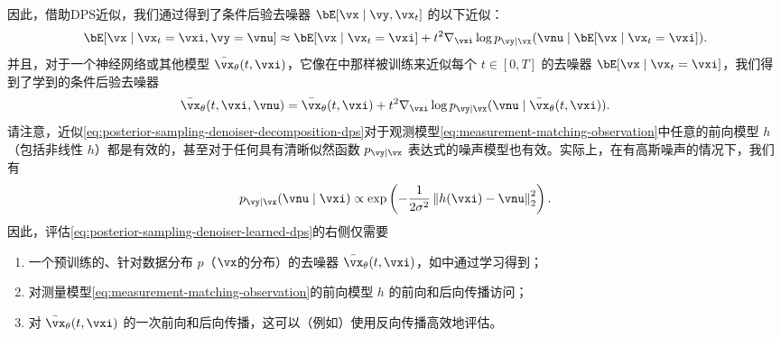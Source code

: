 \documentclass[../../book-main.tex]{subfiles}
\begin{document}
因此，借助DPS近似，我们通过得到了条件后验去噪器 $\bE[\vx \mid \vy, \vx_t]$ 的以下近似：
\begin{equation}
  \bE[ \vx \mid \vx_t=\vxi, \vy=\vnu]
  \approx
  \bE[\vx \mid \vx_t=\vxi] 
  + t^2 \nabla_{\vxi} \log p_{\vy \mid \vx}(\vnu \mid \bE[\vx \mid \vx_t = \vxi]).
  \label{eq:posterior-sampling-denoiser-decomposition-dps}
\end{equation}
并且，对于一个神经网络或其他模型 $\bar{\vx}_{\theta}(t, \vxi)$，它像在中那样被训练来近似每个 $t \in [0, T]$ 的去噪器 $\bE[\vx \mid \vx_t = \vxi]$，我们得到了学到的条件后验去噪器
\begin{equation}
  \bar{\vx}_{\theta}(t, \vxi, \vnu) 
  = \bar{\vx}_{\theta}(t, \vxi)
  + t^2 \nabla_{\vxi} \log p_{\vy \mid \vx}(\vnu \mid \bar{\vx}_{\theta}(t,
  \vxi)).
  \label{eq:posterior-sampling-denoiser-learned-dps}
\end{equation}
请注意，近似\eqref{eq:posterior-sampling-denoiser-decomposition-dps}对于观测模型\eqref{eq:measurement-matching-observation}中任意的前向模型 $h$（包括非线性 $h$）都是有效的，甚至对于任何具有清晰似然函数 $p_{\vy \mid \vx}$ 表达式的噪声模型也有效。实际上，在有高斯噪声的情况下，我们有
\begin{equation}
  p_{\vy \mid \vx}(\vnu \mid \vxi)
  \propto
  \exp\left(
    -\frac{1}{2\sigma^2} \norm*{ h(\vxi) - \vnu }_2^2
  \right).
\end{equation}
因此，评估\eqref{eq:posterior-sampling-denoiser-learned-dps}的右侧仅需要
\begin{enumerate}
  \item 一个预训练的、针对数据分布 $p$（$\vx$的分布）的去噪器 $\bar{\vx}_{\theta}(t, \vxi)$，如中通过学习得到；
  \item 对测量模型\eqref{eq:measurement-matching-observation}的前向模型 $h$ 的前向和后向传播访问；
  \item 对 $\bar{\vx}_{\theta}(t, \vxi)$ 的一次前向和后向传播，这可以（例如）使用反向传播高效地评估。
\end{enumerate}
\end{document}
